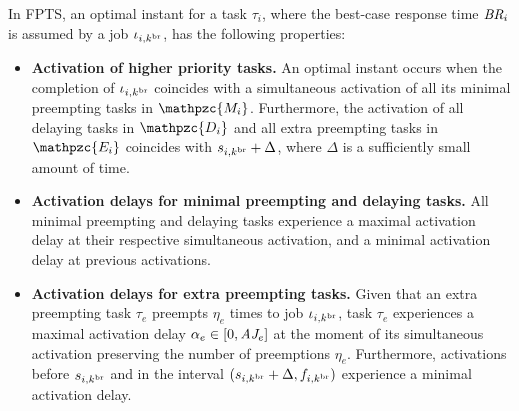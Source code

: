 \begin{theorem} \label{thm:optimal_instant_fpts}
	In FPTS, an optimal instant for a task $\tau_i$, where the best-case response time $\mbox{\it BR}_i$ is assumed by a job $\iota_{i,k^{\rm{br}}}$, has the following properties:
	\begin{itemize}
		\item \textbf{Activation of higher priority tasks.}
		An optimal instant occurs when the completion of $\iota_{i,k^{\rm{br}}}$ coincides with a simultaneous activation of all its {minimal preempting} tasks in $\mathpzc{M_i}$. Furthermore, the activation of all delaying tasks in $\mathpzc{D_i}$ and all {extra preempting} tasks in $\mathpzc{E_i}$ coincides with $s_{i,k^{\rm{br}}}+\Delta$, where $\Delta$ is a sufficiently small amount of time. 
		
		\item \textbf{Activation delays for minimal preempting and delaying tasks.}
		All minimal	preempting and delaying tasks experience a maximal activation delay at their respective simultaneous activation, and a minimal activation delay at previous activations.
		
		\item \textbf{Activation delays for extra preempting tasks.}
		Given that an extra preempting task $\tau_e$ preempts $\eta_e$ times to job $\iota_{i,k^{\rm{br}}}$, task $\tau_e$ experiences a maximal activation delay $\alpha_e \in [0,\mbox{\it AJ}_e]$ at the moment of its simultaneous activation preserving the number of preemptions $\eta_e$. Furthermore, activations before $s_{i,k^{\rm{br}}}$ and in the interval $(s_{i,k^{\rm{br}}}+\Delta, f_{i,k^{\rm{br}}})$ experience a minimal activation delay.
	\end{itemize}

\end{theorem}



